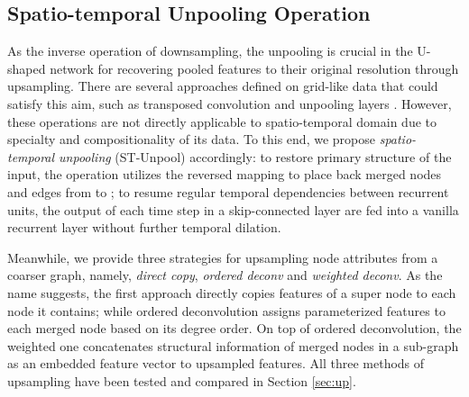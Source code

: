 \documentclass[sigconf,screen]{acmart}
\begin{document}
\subsection{\label{sec:un}Spatio-temporal Unpooling Operation}
As the inverse operation of downsampling, the unpooling is crucial in the U-shaped network for recovering pooled features to their original resolution through upsampling. There are several approaches defined on grid-like data that could satisfy this aim, such as transposed convolution \cite{zeiler2011adaptive} and unpooling layers \cite{zeiler2014visualizing}. However, these operations are not directly applicable to spatio-temporal domain due to specialty and compositionality of its data. To this end, we propose \emph{spatio-temporal unpooling} (ST-Unpool) accordingly: to restore primary structure of the input, the operation utilizes the reversed mapping  to place back merged nodes and edges from  to ; to resume regular temporal dependencies between recurrent units, the output of each time step in a skip-connected layer are fed into a vanilla recurrent layer without further temporal dilation.

Meanwhile, we provide three strategies for upsampling node attributes from a coarser graph, namely, \emph{direct copy}, \emph{ordered deconv} and \emph{weighted deconv}. As the name suggests, the first approach directly copies features of a super node to each node it contains; while ordered deconvolution assigns parameterized features to each merged node based on its degree order. On top of ordered deconvolution, the weighted one concatenates structural information of merged nodes in a sub-graph as an embedded feature vector to upsampled features. All three methods of upsampling have been tested and compared in Section \ref{sec:up}.
\end{document}
